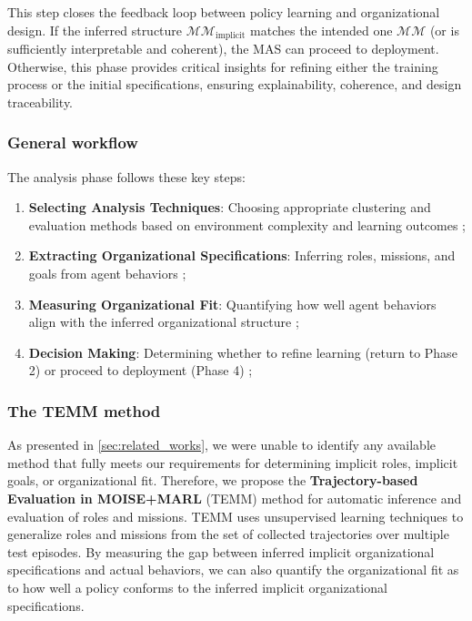 \documentclass[pdflatex,sn-mathphys-num]{sn-jnl}%
\theoremstyle{thmstyleone}%
\theoremstyle{thmstyletwo}%
\theoremstyle{thmstylethree}%
\begin{document}
This step closes the feedback loop between policy learning and organizational design. If the inferred structure $\mathcal{MM}_{\text{implicit}}$ matches the intended one $\mathcal{MM}$ (or is sufficiently interpretable and coherent), the MAS can proceed to deployment. Otherwise, this phase provides critical insights for refining either the training process or the initial specifications, ensuring explainability, coherence, and design traceability.


\subsubsection{General workflow}
The analysis phase follows these key steps:
\begin{enumerate}
    \item \textbf{Selecting Analysis Techniques}: Choosing appropriate clustering and evaluation methods based on environment complexity and learning outcomes ;
    \item \textbf{Extracting Organizational Specifications}: Inferring roles, missions, and goals from agent behaviors ;
    \item \textbf{Measuring Organizational Fit}: Quantifying how well agent behaviors align with the inferred organizational structure ;
    \item \textbf{Decision Making}: Determining whether to refine learning (return to Phase 2) or proceed to deployment (Phase 4) ;
\end{enumerate}

\subsubsection{The TEMM method}
\label{sec:TEMM_algorithm}

As presented in \autoref{sec:related_works}, we were unable to identify any available method that fully meets our requirements for determining implicit roles, implicit goals, or organizational fit. Therefore, we propose the \textbf{Trajectory-based Evaluation in MOISE+MARL} (TEMM) method for automatic inference and evaluation of roles and missions.
%
TEMM uses unsupervised learning techniques to generalize roles and missions from the set of collected trajectories over multiple test episodes. By measuring the gap between inferred implicit organizational specifications and actual behaviors, we can also quantify the organizational fit as to how well a policy conforms to the inferred implicit organizational specifications.
\end{document}
